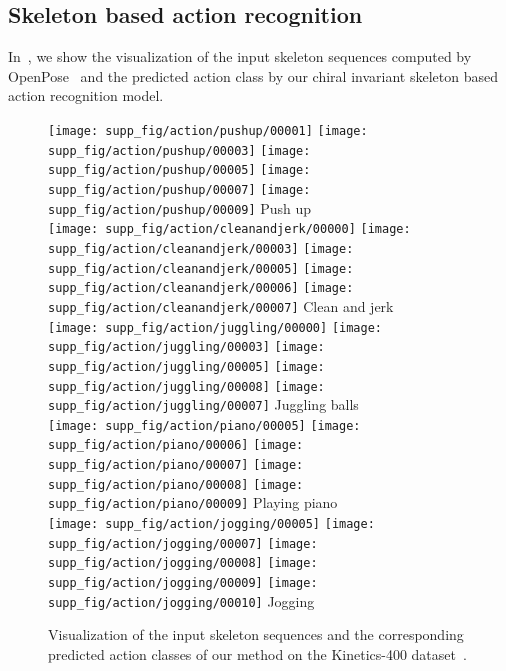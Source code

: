 \documentclass{article}
\begin{document}
\subsection{Skeleton based action recognition}
In~, we show the visualization of the input skeleton sequences computed by OpenPose~\cite{cao2018openpose} and the predicted action class by our chiral invariant skeleton based action recognition model.
\begin{figure}[t]
\centering
\hspace{-0.6cm}\texttt{[image: supp\_fig/action/pushup/00001]}
\texttt{[image: supp\_fig/action/pushup/00003]}
\texttt{[image: supp\_fig/action/pushup/00005]}
\texttt{[image: supp\_fig/action/pushup/00007]}
\texttt{[image: supp\_fig/action/pushup/00009]}
Push up\\
\hspace{-0.6cm}\texttt{[image: supp\_fig/action/cleanandjerk/00000]}
\texttt{[image: supp\_fig/action/cleanandjerk/00003]}
\texttt{[image: supp\_fig/action/cleanandjerk/00005]}
\texttt{[image: supp\_fig/action/cleanandjerk/00006]}
\texttt{[image: supp\_fig/action/cleanandjerk/00007]}
Clean and jerk\\
\hspace{-0.6cm}\texttt{[image: supp\_fig/action/juggling/00000]}
\texttt{[image: supp\_fig/action/juggling/00003]}
\texttt{[image: supp\_fig/action/juggling/00005]}
\texttt{[image: supp\_fig/action/juggling/00008]}
\texttt{[image: supp\_fig/action/juggling/00007]}
Juggling balls\\
\hspace{-0.6cm}\texttt{[image: supp\_fig/action/piano/00005]}
\texttt{[image: supp\_fig/action/piano/00006]}
\texttt{[image: supp\_fig/action/piano/00007]}
\texttt{[image: supp\_fig/action/piano/00008]}
\texttt{[image: supp\_fig/action/piano/00009]}
Playing piano\\
\hspace{-0.6cm}\texttt{[image: supp\_fig/action/jogging/00005]}
\texttt{[image: supp\_fig/action/jogging/00007]}
\texttt{[image: supp\_fig/action/jogging/00008]}
\texttt{[image: supp\_fig/action/jogging/00009]}
\texttt{[image: supp\_fig/action/jogging/00010]}
Jogging\\

\caption{Visualization of the input skeleton sequences and the corresponding predicted action classes of our method on the Kinetics-400 dataset~\cite{kay2017kinetics}.}
\label{fig:supp_action}
\end{figure} 
\end{document}
